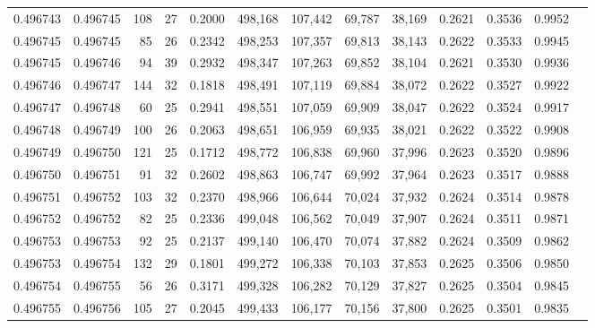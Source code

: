 \begin{tabular}{rrrrrrrrrrrrr}
0.496743 & 0.496745 & 108 &  27 &                                     0.2000 & 498,168 & 107,442 &  69,787 &  38,169 & 0.2621 & 0.3536 & 0.9952 \\
0.496745 & 0.496745 &  85 &  26 &                                     0.2342 & 498,253 & 107,357 &  69,813 &  38,143 & 0.2622 & 0.3533 & 0.9945 \\
0.496745 & 0.496746 &  94 &  39 &                                     0.2932 & 498,347 & 107,263 &  69,852 &  38,104 & 0.2621 & 0.3530 & 0.9936 \\
0.496746 & 0.496747 & 144 &  32 &                                     0.1818 & 498,491 & 107,119 &  69,884 &  38,072 & 0.2622 & 0.3527 & 0.9922 \\
0.496747 & 0.496748 &  60 &  25 &                                     0.2941 & 498,551 & 107,059 &  69,909 &  38,047 & 0.2622 & 0.3524 & 0.9917 \\
0.496748 & 0.496749 & 100 &  26 &                                     0.2063 & 498,651 & 106,959 &  69,935 &  38,021 & 0.2622 & 0.3522 & 0.9908 \\
0.496749 & 0.496750 & 121 &  25 &                                     0.1712 & 498,772 & 106,838 &  69,960 &  37,996 & 0.2623 & 0.3520 & 0.9896 \\
0.496750 & 0.496751 &  91 &  32 &                                     0.2602 & 498,863 & 106,747 &  69,992 &  37,964 & 0.2623 & 0.3517 & 0.9888 \\
0.496751 & 0.496752 & 103 &  32 &                                     0.2370 & 498,966 & 106,644 &  70,024 &  37,932 & 0.2624 & 0.3514 & 0.9878 \\
0.496752 & 0.496752 &  82 &  25 &                                     0.2336 & 499,048 & 106,562 &  70,049 &  37,907 & 0.2624 & 0.3511 & 0.9871 \\
0.496753 & 0.496753 &  92 &  25 &                                     0.2137 & 499,140 & 106,470 &  70,074 &  37,882 & 0.2624 & 0.3509 & 0.9862 \\
0.496753 & 0.496754 & 132 &  29 &                                     0.1801 & 499,272 & 106,338 &  70,103 &  37,853 & 0.2625 & 0.3506 & 0.9850 \\
0.496754 & 0.496755 &  56 &  26 &                                     0.3171 & 499,328 & 106,282 &  70,129 &  37,827 & 0.2625 & 0.3504 & 0.9845 \\
0.496755 & 0.496756 & 105 &  27 &                                     0.2045 & 499,433 & 106,177 &  70,156 &  37,800 & 0.2625 & 0.3501 & 0.9835 \\

\end{tabular}
